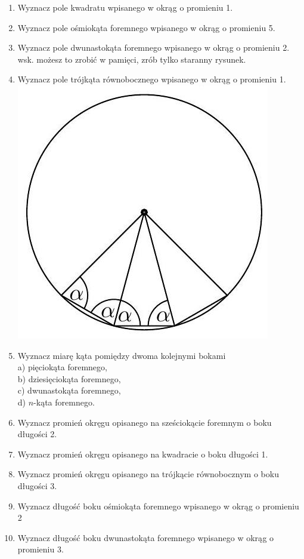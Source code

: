 \documentclass[10pt]{article}
\begin{document}
\begin{enumerate}
  \item Wyznacz pole kwadratu wpisanego w okrąg o promieniu 1.
  \item Wyznacz pole ośmiokąta foremnego wpisanego w okrąg o promieniu 5.
  \item Wyznacz pole dwunastokąta foremnego wpisanego w okrąg o promieniu 2. wsk. możesz to zrobić w pamięci, zrób tylko staranny rysunek.
  \item Wyznacz pole trójkąta równobocznego wpisanego w okrąg o promieniu 1.\\
\includegraphics[max width=\textwidth, center]{2024_11_21_e9b4faa005d5be2cc318g-056}
  \item Wyznacz miarę kąta pomiędzy dwoma kolejnymi bokami\\
a) pięciokąta foremnego,\\
b) dziesięciokąta foremnego,\\
c) dwunastokąta foremnego,\\
d) \(n\)-kąta foremnego.
  \item Wyznacz promień okręgu opisanego na sześciokącie foremnym o boku długości 2.
  \item Wyznacz promień okręgu opisanego na kwadracie o boku długości 1.
  \item Wyznacz promień okręgu opisanego na trójkącie równobocznym o boku długości 3.
  \item Wyznacz długość boku ośmiokąta foremnego wpisanego w okrąg o promieniu 2
  \item Wyznacz długość boku dwunastokąta foremnego wpisanego w okrąg o promieniu 3.
\end{enumerate}
\end{document}
